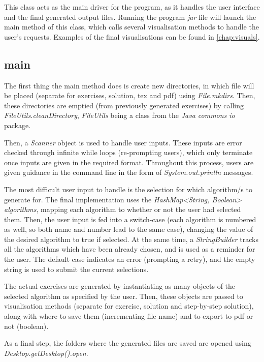 \documentclass{l4proj}
\begin{document}
This class acts as the main driver for the program, as it handles the user interface and the final generated output files. Running the program \emph{jar} file will launch the main method of this class, which calls several visualisation methods to handle the user's requests. Examples of the final visualisations can be found in \autoref{chap:visuals}.

\subsection{main}

The first thing the main method does is create new directories, in which file will be placed (separate for exercises, solution, tex and pdf) using \emph{File.mkdirs}. Then, these directories are emptied (from previously generated exercises) by calling \emph{FileUtils.cleanDirectory}, \emph{FileUtils} being a class from the \emph{Java commons io} package.

Then, a \emph{Scanner} object is used to handle user inputs. These inputs are error checked through infinite while loops (re-prompting users), which only terminate once inputs are given in the required format. Throughout this process, users are given guidance in the command line in the form of \emph{System.out.println} messages.

The most difficult user input to handle is the selection for which algorithm/s to generate for. The final implementation uses the \emph{HashMap<String, Boolean> algorithms}, mapping each algorithm to whether or not the user had selected them. Then, the user input is fed into a switch-case (each algorithm is numbered as well, so both name and number lead to the same case), changing the value of the desired algorithm to true if selected. At the same time, a \emph{StringBuilder} tracks all the algorithms which have been already chosen, and is used as a reminder for the user. The default case indicates an error (prompting a retry), and the empty string is used to submit the current selections.

The actual exercises are generated by instantiating as many objects of the selected algorithm as specified by the user. Then, these objects are passed to visualisation methods (separate for exercise, solution and step-by-step solution), along with where to save them (incrementing file name) and to export to pdf or not (boolean).

As a final step, the folders where the generated files are saved are opened using \emph{Desktop.getDesktop().open}.
\end{document}
